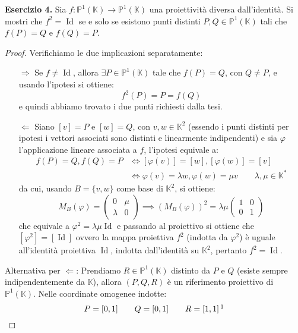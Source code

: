 \documentclass[12pt]{article}
\theoremstyle{remark}
\theoremstyle{definition}
\newenvironment{solution}{\renewcommand{\proofname}{Soluzione}\begin{proof}}{\end{proof}}
\newcommand{\PP}{\mathbb{P}}
\newcommand{\KK}{\mathbb{K}}
\DeclareMathOperator{\id}{Id}
\begin{document}
\noindent \textbf{Esercizio 4.} Sia $f : \PP^1(\KK) \longrightarrow \PP^1(\KK)$ una proiettività diversa dall'identità. Si mostri che $f^2 = \id$ se e solo se esistono punti distinti $P,Q \in \PP^1(\KK)$ tali che 
$f(P) = Q$ e $f(Q) = P$.

\begin{solution}
  Verifichiamo le due implicazioni separatamente:
  \begin{itemize}
    \item[$\boxed{\Longrightarrow}$] Se $f \ne \id$, allora $\exists P \in \PP^1(\KK)$ tale che $f(P) = Q$, con $Q \ne P$, e usando l'ipotesi si ottiene:
    \[ f^2(P) = P = f(Q)
      \]
    e quindi abbiamo trovato i due punti richiesti dalla tesi.
    \item[$\boxed{\Longleftarrow}$] Siano $[v] = P$ e $[w] = Q$, con $v,w \in \KK^2$ (essendo i punti distinti per ipotesi i vettori associati sono distinti e linearmente indipendenti) e sia $\varphi$ l'applicazione lineare associata a $f$, l'ipotesi equivale a:
    \[ \begin{split}
      f(P) = Q, f(Q) = P &\iff [\varphi(v)] = [w], [\varphi(w)] = [v]\\
                         &\iff \varphi(v) = \lambda w, \varphi(w) = \mu v \qquad \lambda,\mu \in \KK^*
    \end{split}
      \]
    da cui, usando $B = \{v,w\}$ come base di $\KK^2$, si ottiene:
    \[ M_B(\varphi) = \begin{pmatrix}
      0 & \mu \\
      \lambda &  0
    \end{pmatrix} \implies (M_B(\varphi))^2 = \lambda \mu \begin{pmatrix}
      1 & 0 \\
      0 & 1
    \end{pmatrix}
      \]
    che equivale a $\varphi^2 = \lambda \mu \id$ e passando al proiettivo si ottiene che $[\varphi^2] = [\id]$ ovvero la mappa proiettiva $f^2$ (indotta da $\varphi^2$) è uguale 
    all'identità proiettiva $\id$, indotta dall'identità su $\KK^2$, pertanto $f^2 = \id$.
  \end{itemize}
  Alternativa per $\boxed{\Longleftarrow}$: Prendiamo $R \in \PP^1( \KK)$ distinto da $P$ e $Q$ (esiste sempre indipendentemente da $\KK$), allora $(P,Q,R)$ è un riferimento proiettivo di $\PP^1(\KK)$.
  Nelle coordinate omogenee indotte:
  \[ P = [0,1] \qquad Q = [0,1] \qquad R = [1,1] \, \footnote{$R$ è il punto unità del riferimento, e la scelta della base normalizzata è coerente con quella del punto unità (abbiamo visto a lezione che esiste sempre una proiettività che porta il riferimento $\mathscr{R}$ in quello standard, quindi possiamo sempre prendere la base normalizzata associata a quest'ultimo, ovvero quella canonica, da cui le coordinate omogenee scelte).}
\]
\end{solution}
\end{document}

